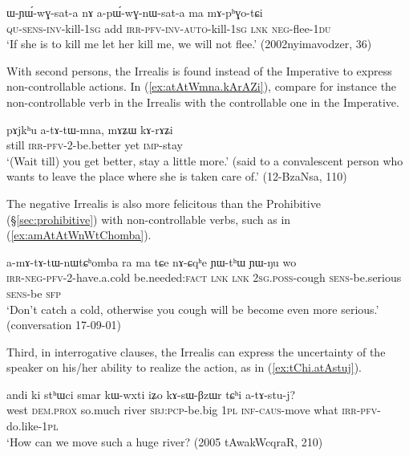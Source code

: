 \begin{exe}
\ex \label{ex:apWGnWsata}
\gll ɯ-ɲɯ́-wɣ-sat-a nɤ a-pɯ́-wɣ-nɯ-sat-a ma mɤ-pʰɣo-tɕi \\
\textsc{qu}-\textsc{sens}-\textsc{inv}-kill-\textsc{1sg} add \textsc{irr}-\textsc{pfv}-\textsc{inv}-\textsc{auto}-kill-\textsc{1sg} \textsc{lnk} \textsc{neg}-flee-\textsc{1du} \\
\glt `If she is to kill me let her kill me, we will not flee.' (2002nyimavodzer, 36)
\end{exe}

With second persons, the Irrealis is found instead of the Imperative to express non-controllable actions. In (\ref{ex:atAtWmna.kArAZi}), compare for instance the non-controllable verb  in the Irrealis with the controllable one  in the Imperative.

\begin{exe}
\ex \label{ex:atAtWmna.kArAZi}
\gll pɤjkʰu a-tɤ-tɯ-mna, mɤʑɯ kɤ-rɤʑi \\
still \textsc{irr}-\textsc{pfv}-2-be.better yet \textsc{imp}-stay \\
\glt `(Wait till) you get better, stay a little more.' (said to a convalescent person who wants to leave the place where she is taken care of.'  (12-BzaNsa, 110)
\end{exe}

The negative Irrealis is also more felicitous than the Prohibitive (§\ref{sec:prohibitive}) with non-controllable verbs, such as  in (\ref{ex:amAtAtWnWtChomba}).

\begin{exe}
\ex \label{ex:amAtAtWnWtChomba}
\gll a-mɤ-tɤ-tɯ-nɯtɕʰomba ra ma tɕe nɤ-ɕqʰe ɲɯ-tʰɯ ɲɯ-ŋu wo \\
\textsc{irr}-\textsc{neg}-\textsc{pfv}-2-have.a.cold be.needed:\textsc{fact} \textsc{lnk} \textsc{lnk} \textsc{2sg}.\textsc{poss}-cough \textsc{sens}-be.serious \textsc{sens}-be \textsc{sfp} \\
\glt `Don't catch a cold, otherwise you cough will be become even more serious.' (conversation 17-09-01)
\end{exe}

Third, in interrogative clauses, the Irrealis can express the uncertainty of the speaker on his/her ability to realize the action,  as in (\ref{ex:tChi.atAstuj}).

\begin{exe}
\ex \label{ex:tChi.atAstuj}
\gll andi ki stʰɯci smar kɯ-wxti iʑo kɤ-sɯ-βzɯr tɕʰi a-tɤ-stu-j? \\
west \textsc{dem}.\textsc{prox} so.much river \textsc{sbj}:\textsc{pcp}-be.big \textsc{1pl} \textsc{inf}-\textsc{caus}-move what \textsc{irr}-\textsc{pfv}-do.like-\textsc{1pl} \\
\glt `How can we move such a huge river? (2005 tAwakWcqraR, 210)
\end{exe}

